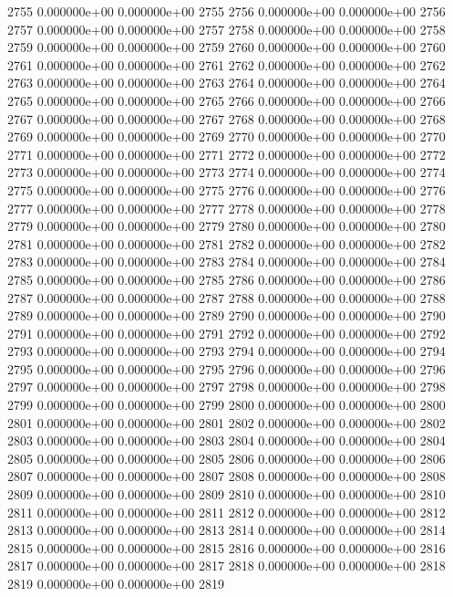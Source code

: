 \documentclass{article}
\begin{document}
\begin{Schunk}
\begin{Soutput}
2755   0.000000e+00   0.000000e+00 2755
2756   0.000000e+00   0.000000e+00 2756
2757   0.000000e+00   0.000000e+00 2757
2758   0.000000e+00   0.000000e+00 2758
2759   0.000000e+00   0.000000e+00 2759
2760   0.000000e+00   0.000000e+00 2760
2761   0.000000e+00   0.000000e+00 2761
2762   0.000000e+00   0.000000e+00 2762
2763   0.000000e+00   0.000000e+00 2763
2764   0.000000e+00   0.000000e+00 2764
2765   0.000000e+00   0.000000e+00 2765
2766   0.000000e+00   0.000000e+00 2766
2767   0.000000e+00   0.000000e+00 2767
2768   0.000000e+00   0.000000e+00 2768
2769   0.000000e+00   0.000000e+00 2769
2770   0.000000e+00   0.000000e+00 2770
2771   0.000000e+00   0.000000e+00 2771
2772   0.000000e+00   0.000000e+00 2772
2773   0.000000e+00   0.000000e+00 2773
2774   0.000000e+00   0.000000e+00 2774
2775   0.000000e+00   0.000000e+00 2775
2776   0.000000e+00   0.000000e+00 2776
2777   0.000000e+00   0.000000e+00 2777
2778   0.000000e+00   0.000000e+00 2778
2779   0.000000e+00   0.000000e+00 2779
2780   0.000000e+00   0.000000e+00 2780
2781   0.000000e+00   0.000000e+00 2781
2782   0.000000e+00   0.000000e+00 2782
2783   0.000000e+00   0.000000e+00 2783
2784   0.000000e+00   0.000000e+00 2784
2785   0.000000e+00   0.000000e+00 2785
2786   0.000000e+00   0.000000e+00 2786
2787   0.000000e+00   0.000000e+00 2787
2788   0.000000e+00   0.000000e+00 2788
2789   0.000000e+00   0.000000e+00 2789
2790   0.000000e+00   0.000000e+00 2790
2791   0.000000e+00   0.000000e+00 2791
2792   0.000000e+00   0.000000e+00 2792
2793   0.000000e+00   0.000000e+00 2793
2794   0.000000e+00   0.000000e+00 2794
2795   0.000000e+00   0.000000e+00 2795
2796   0.000000e+00   0.000000e+00 2796
2797   0.000000e+00   0.000000e+00 2797
2798   0.000000e+00   0.000000e+00 2798
2799   0.000000e+00   0.000000e+00 2799
2800   0.000000e+00   0.000000e+00 2800
2801   0.000000e+00   0.000000e+00 2801
2802   0.000000e+00   0.000000e+00 2802
2803   0.000000e+00   0.000000e+00 2803
2804   0.000000e+00   0.000000e+00 2804
2805   0.000000e+00   0.000000e+00 2805
2806   0.000000e+00   0.000000e+00 2806
2807   0.000000e+00   0.000000e+00 2807
2808   0.000000e+00   0.000000e+00 2808
2809   0.000000e+00   0.000000e+00 2809
2810   0.000000e+00   0.000000e+00 2810
2811   0.000000e+00   0.000000e+00 2811
2812   0.000000e+00   0.000000e+00 2812
2813   0.000000e+00   0.000000e+00 2813
2814   0.000000e+00   0.000000e+00 2814
2815   0.000000e+00   0.000000e+00 2815
2816   0.000000e+00   0.000000e+00 2816
2817   0.000000e+00   0.000000e+00 2817
2818   0.000000e+00   0.000000e+00 2818
2819   0.000000e+00   0.000000e+00 2819

\end{Soutput}
\end{Schunk}
\end{document}
